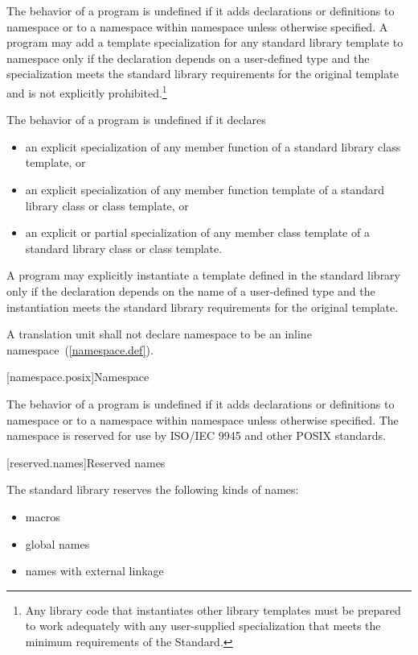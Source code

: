 \pnum
The behavior of a \Cpp program is undefined if it adds declarations or definitions to namespace
or to a namespace within namespace
unless otherwise specified.
A program may add a template specialization for any standard library template
to namespace
 only if the declaration
depends on a user-defined type
and the specialization meets the standard library requirements
for the original template and is not explicitly prohibited.\footnote{Any
library code that instantiates other library templates
must be prepared to work adequately with any user-supplied specialization
that meets the minimum requirements of the Standard.}

\pnum
The behavior of a \Cpp program is undefined if it declares
\begin{itemize}
\item an explicit specialization of any member function of a standard
library class template, or

\item an explicit specialization of any member function template of a
standard library class or class template, or

\item an explicit or partial specialization of any member class template
of a standard library class or class template.
\end{itemize}
A program may explicitly instantiate a template defined in the standard library
only if the declaration depends on the name of a user-defined type
and the instantiation meets the standard library requirements for the
original template.

\pnum
A translation unit shall not declare namespace  to be an inline namespace~(\ref{namespace.def}).

[namespace.posix]{Namespace }

\pnum
The behavior of a \Cpp program is undefined if it adds declarations or definitions to namespace
or to a namespace within namespace
unless otherwise specified. The namespace  is reserved for use by
ISO/IEC 9945 and other POSIX standards.

[reserved.names]{Reserved names}%

\pnum
The \Cpp standard library reserves the following kinds of names:
\begin{itemize}
\item macros
\item global names
\item names with external linkage
\end{itemize}

